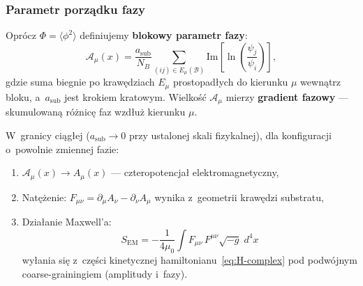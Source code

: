\subsubsection{Parametr porządku fazy}

Oprócz $\Phi = \langle\phi^2\rangle$ definiujemy \textbf{blokowy
parametr fazy}:
\begin{equation}\label{eq:phase-order}
    \mathcal{A}_\mu(x) = \frac{a_{\mathrm{sub}}}{N_B}
    \sum_{(ij) \in E_\mu(\mathcal{B})}
    \mathrm{Im}\!\left[\ln\!\left(\frac{\psi_j}{\psi_i}\right)\right],
\end{equation}
gdzie suma biegnie po krawędziach $E_\mu$ prostopadłych do kierunku
$\mu$ wewnątrz bloku, a~$a_{\mathrm{sub}}$ jest krokiem kratowym.
Wielkość $\mathcal{A}_\mu$ mierzy \textbf{gradient fazowy} ---
skumulowaną różnicę faz wzdłuż kierunku $\mu$.

\begin{theorem}\label{thm:photon-emergence}
W~granicy ciągłej ($a_{\mathrm{sub}} \to 0$ przy ustalonej
skali fizykalnej), dla konfiguracji o~powolnie zmiennej fazie:
\begin{enumerate}[nosep]
    \item $\mathcal{A}_\mu(x) \to A_\mu(x)$ --- czteropotencjał
          elektromagnetyczny,
    \item Natężenie: $F_{\mu\nu} = \partial_\mu A_\nu
          - \partial_\nu A_\mu$ wynika z~geometrii krawędzi substratu,
    \item Działanie Maxwell'a:
          \begin{equation}\label{eq:maxwell-action}
              S_{\mathrm{EM}}
              = -\frac{1}{4\mu_0}\int F_{\mu\nu}\,F^{\mu\nu}
                \sqrt{-g}\;d^4x
          \end{equation}
          wyłania się z~części kinetycznej hamiltonianu~\eqref{eq:H-complex}
          pod podwójnym coarse-grainingiem (amplitudy i~fazy).
\end{enumerate}
\end{theorem}

